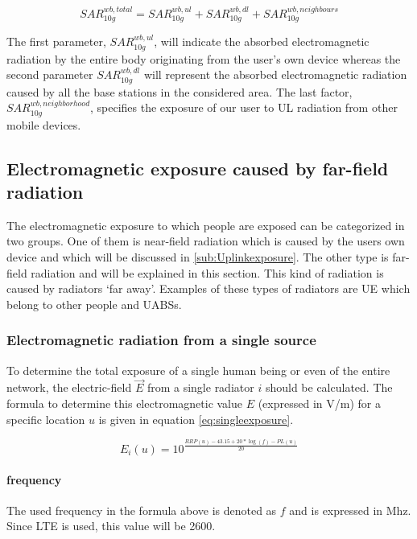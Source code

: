 \begin{equation} 
SAR^{wb,total}_{10g} = SAR^{wb,ul}_{10g} +  SAR^{wb,dl}_{10g} + SAR^{wb,neighbours}_{10g}
\label{eq:overallSARwb}
\end{equation}

The first parameter, $SAR^{wb,ul}_{10g}$, will indicate the absorbed electromagnetic radiation by the entire body originating from the user's own device
whereas the second parameter $SAR^{wb,dl}_{10g}$ will represent the absorbed electromagnetic radiation caused by all the base stations in the considered area.
The last factor, $SAR^{wb,neighborhood}_{10g}$, specifies the exposure of our user to \gls{UL} radiation from other mobile devices.

\subsection{Electromagnetic exposure caused by far-field radiation} %
\label{sub:Calculatingdownlinkexpsure}

The electromagnetic exposure to which people are exposed can be categorized in two groups. One of them is near-field radiation which is caused 
by the users own device and which will be discussed in \ref{sub:Uplinkexposure}.
The other type is far-field radiation and will be explained in this section. This kind of radiation is caused by radiators `far away'.
Examples of these types of radiators are \gls{UE} which belong to other people and \gls{UABS}s. 

\subsubsection{Electromagnetic radiation from a single source}
\label{sec:calculatingexposure}

To determine the total exposure of a single human being or even of the entire network, the electric-field $\vec{E}$ from a single radiator $i$ should be calculated.
The formula to determine this electromagnetic value $E$ (expressed in V/m) for a specific location $u$ is given in equation \ref{eq:singleexposure}.

\begin{equation}
E_i(u) = 10^{\frac{RRP(u) - 43.15 + 20*\log(f)- PL(u)}{20}}
\label{eq:singleexposure}
\end{equation}

\paragraph{frequency}
The used frequency in the formula above is denoted as $f$ and is expressed in Mhz. Since LTE is used, this value will be 2600.

